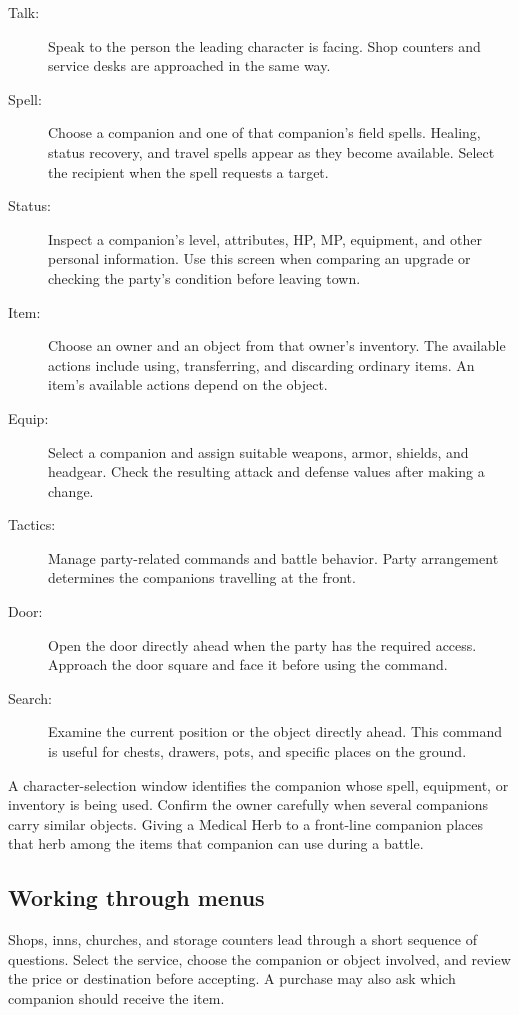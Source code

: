 \begin{description}
  \item[Talk:] Speak to the person the leading character is facing. Shop
    counters and service desks are approached in the same way.
  \item[Spell:] Choose a companion and one of that companion's field spells.
    Healing, status recovery, and travel spells appear as they become
    available. Select the recipient when the spell requests a target.
  \item[Status:] Inspect a companion's level, attributes, HP, MP, equipment,
    and other personal information. Use this screen when comparing an
    upgrade or checking the party's condition before leaving town.
  \item[Item:] Choose an owner and an object from that owner's inventory.
    The available actions include using, transferring, and discarding
    ordinary items. An item's available actions depend on the object.
  \item[Equip:] Select a companion and assign suitable weapons, armor,
    shields, and headgear. Check the resulting attack and defense values
    after making a change.
  \item[Tactics:] Manage party-related commands and battle behavior.
    Party arrangement determines the companions travelling at the front.
  \item[Door:] Open the door directly ahead when the party has the required
    access. Approach the door square and face it before using the command.
  \item[Search:] Examine the current position or the object directly ahead.
    This command is useful for chests, drawers, pots, and specific places
    on the ground.
\end{description}

A character-selection window identifies the companion whose spell,
equipment, or inventory is being used. Confirm the owner carefully when
several companions carry similar objects. Giving a Medical Herb to a
front-line companion places that herb among the items that companion can
use during a battle.

\subsection*{Working through menus}

Shops, inns, churches, and storage counters lead through a short sequence
of questions. Select the service, choose the companion or object involved,
and review the price or destination before accepting. A purchase may also
ask which companion should receive the item.

